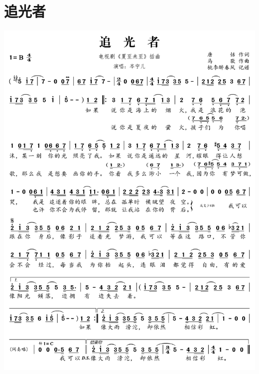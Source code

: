 \documentclass[cn,pad,twocol]{elegantbook}
\begin{document}
\section{追光者} \includegraphics[width=\textwidth]{macos/20210208追光者.png}
\end{document}
